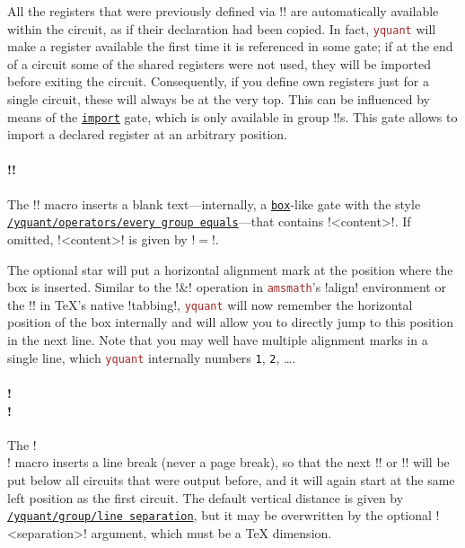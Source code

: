 \documentclass{scrartcl}
\def\pkg#1{\textcolor{brown}{\texttt{#1}}}
\def\gate#1{\hyperref[gate:#1]{\texttt{#1}}}
\def\style#1{\hyperref[style:#1]{\texttt{#1}}}
\def\Yquant{\pkg{yquant}}
\begin{document}
               All the registers that were previously defined via \tex!\registers! are automatically available within the circuit, as if their declaration had been copied.
               In fact, \Yquant{} will make a register available the first time it is referenced in some gate; if at the end of a circuit some of the shared registers were not used, they will be imported before exiting the circuit.
               Consequently, if you define own registers just for a single circuit, these will always be at the very top.
               This can be influenced by means of the \gate{import} gate, which is only available in group \tex!\circuit!s.
               This gate allows to import a declared register at an arbitrary position.

            \paragraph*{\tex!\equals*[<content>]!}\label{sec:foreign:groups:equals}
               The \tex!\equals! macro inserts a blank text---internally, a \gate{box}\hyp like gate with the style \style{/yquant/operators/every group equals}---that contains \tex!<content>!.
               If omitted, \tex!<content>! is given by \tex!$=$!.

               The optional star will put a horizontal alignment mark at the position where the box is inserted.
               Similar to the \tex!&! operation in \pkg{amsmath}'s \tex!align! environment or the \tex!\>! in \TeX's native \tex!tabbing!, \Yquant{} will now remember the horizontal position of the box internally and will allow you to directly jump to this position in the next line.
               Note that you may well have multiple alignment marks in a single line, which \Yquant{} internally numbers \texttt{1}, \texttt{2}, \dots.

            \paragraph*{\tex!\\[<separation>]!}
               The \tex!\\! macro inserts a line break (never a page break), so that the next \tex!\circuit! or \tex!\equals! will be put below all circuits that were output before, and it will again start at the same left position as the first circuit.
               The default vertical distance is given by \style{/yquant/group/line separation}, but it may be overwritten by the optional \tex!<separation>! argument, which must be a \TeX{} dimension.
\end{document}
